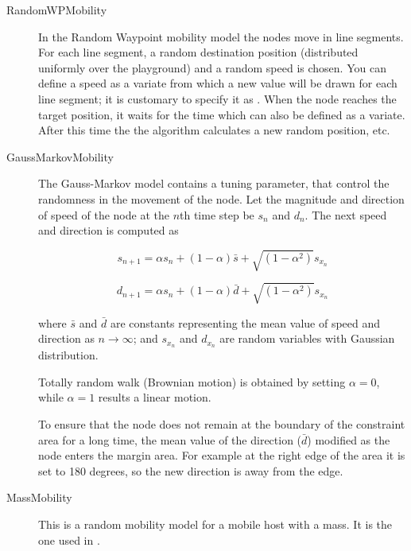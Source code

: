 \begin{description}

\item[RandomWPMobility]

In the Random Waypoint mobility model the nodes move in line segments. For each
line segment, a random destination position (distributed uniformly over the
playground) and a random speed is chosen. You can define a speed as a variate
from which a new value will be drawn for each line segment; it is customary to
specify it as . When the node reaches the
target position, it waits for the time  which can also be defined as a
variate. After this time the the algorithm calculates a new random position, etc.

\item[GaussMarkovMobility] The Gauss-Markov model contains a tuning
parameter, that control the randomness in the movement of the node.
Let the magnitude and direction of speed of the node at the $n$th time step be
$s_n$ and $d_n$. The next speed and direction is computed as

$$ s_{n+1} = \alpha s_n + (1 - \alpha) \bar{s} +
             \sqrt{(1-\alpha^2)} s_{x_n} $$

$$ d_{n+1} = \alpha s_n + (1 - \alpha) \bar{d} +
             \sqrt{(1-\alpha^2)} s_{x_n} $$

where $\bar{s}$ and $\bar{d}$ are constants representing the mean value
of speed and direction as $n \to \infty$; and $s_{x_n}$ and $d_{x_n}$
are random variables with Gaussian distribution.

Totally random walk (Brownian motion) is obtained by setting $\alpha=0$,
while $\alpha=1$ results a linear motion.

To ensure that the node does not remain at the boundary of the constraint
area for a long time, the mean value of the direction ($\bar{d}$) modified
as the node enters the margin area. For example at the right edge of the
area it is set to 180 degrees, so the new direction is away from the edge.


\item[MassMobility] 

This is a random mobility model for a mobile host with
a mass. It is the one used in \cite{Perkins99optimizedsmooth}.


\end{description}
